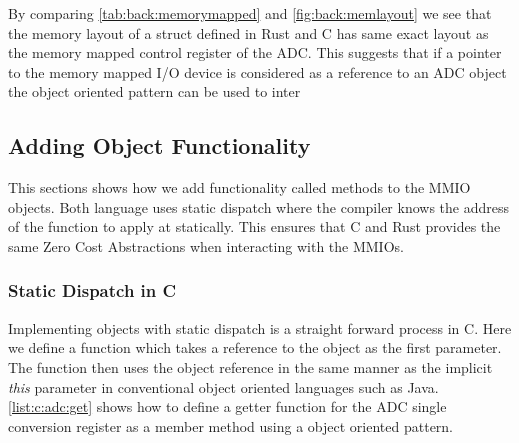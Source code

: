 By comparing \autoref{tab:back:memorymapped} and \autoref{fig:back:memlayout} we see that the memory layout of a struct defined in Rust and C has same exact layout as the memory mapped control register of the ADC.
This suggests that if a pointer to the memory mapped I/O device is considered as a reference to an ADC object the object oriented pattern can be used to inter

\subsection{Adding Object Functionality}

This sections shows how we add functionality called methods to the MMIO objects.
Both language uses static dispatch where the compiler knows the address of the function to apply at statically.
This ensures that C and Rust provides the same Zero Cost Abstractions when interacting with the MMIOs.

\subsubsection{Static Dispatch in C}

Implementing objects with static dispatch is a straight forward process in C.
Here we define a function which takes a reference to the object as the first parameter.
The function then uses the object reference in the same manner as the implicit \emph{this} parameter in conventional object oriented languages such as Java.
\autoref{list:c:adc:get} shows how to define a getter function for the ADC single conversion register as a member method using a object oriented pattern.

